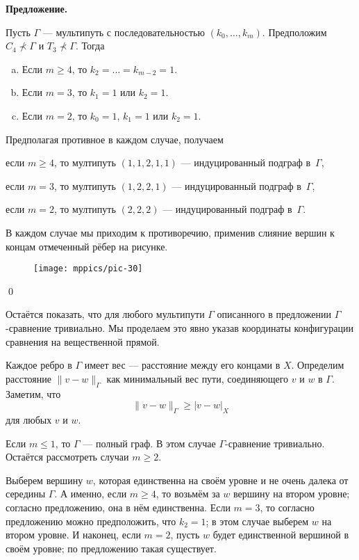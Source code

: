 \documentclass{article}
\def\parit#1{\medskip\noindent{\it #1}}
\def\qeds{\qed\par\medskip}
\def\qedsf{\vskip-6mm\qeds}
\newcounter{thm}[section]
\def\claim#1{\par\medskip\noindent\refstepcounter{thm}\hbox{\bf\boldmath #1.}
\it\ %
}
\def\endclaim{
\par\medskip}
\newenvironment{thm}{\claim}{\endclaim}
\begin{document}
\begin{thm}{Предложение}
Пусть $\Gamma$ --- мультипуть с последовательностью $(k_0,\dots, k_m)$.
Предположим $C_4\nprec\Gamma$ и $T_3\nprec\Gamma$.
Тогда
\begin{enumerate}[(a)]
 \item\label{lem:multipath:5} Если $m\geqslant 4$, то $k_2=\dots=k_{m-2}=1$.
 \item\label{lem:multipath:4} Если $m= 3$, то $k_1=1$ или $k_2=1$.
 \item\label{lem:multipath:3} Если $m= 2$, то $k_0=1$, $k_1=1$ или $k_2=1$.
\end{enumerate}

\end{thm}

\parit{Доказательство.} Предполагая противное в каждом случае, получаем

\parit{(\ref{lem:multipath:5})}
если $m\geqslant 4$, то мултипуть $(1,1,2,1,1)$ --- индуцированный подграф в~$\Gamma$,

\parit{(\ref{lem:multipath:4})}
если $m=3$, то мултипуть $(1,2,2,1)$ --- индуцированный подграф в~$\Gamma$,

\parit{(\ref{lem:multipath:3})}
если $m=2$, то мултипуть $(2,2,2)$ --- индуцированный подграф в~$\Gamma$.

В каждом случае мы приходим к противоречию, применив слияние вершин к концам отмеченный рёбер на рисунке.

\begin{figure}[h!]
\centering
\texttt{[image: mppics/pic-30]}
\end{figure}
\qedsf

Остаётся показать, что для любого мультипути $\Gamma$ описанного в предложении
$\Gamma$-сравнение тривиально.
Мы проделаем это явно указав координаты конфигурации сравнения на вещественной прямой.

Каждое ребро в $\Gamma$ имеет вес --- расстояние между его концами в $X$.
Определим расстояние $\|v-w\|_\Gamma$ как минимальный вес пути, соединяющего $v$ и $w$ в $\Gamma$.
Заметим, что 
\[\|v-w\|_\Gamma\geqslant |v-w|_X\]
для любых $v$ и $w$.

Если $m\leqslant 1$, то $\Gamma$ --- полный граф.
В этом случае $\Gamma$-сравнение тривиально.
Остаётся рассмотреть случаи $m\geqslant2$.

Выберем вершину $w$, которая единственна на своём уровне и не очень далека от середины $\Gamma$.
А именно, если $m\geqslant 4$, то возьмём за $w$ вершину на втором уровне; 
согласно предложению, она в нём единственна.
Если $m=3$, то согласно предложению можно предположить, что $k_2=1$;
в этом случае выберем $w$ на втором уровне.
И наконец, если $m=2$, пусть $w$ будет единственной вершиной в своём уровне;
по предложению такая существует.
\end{document}
